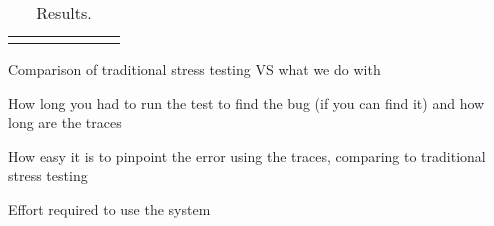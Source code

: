 \setlength{\tabcolsep}{.42em}
\begin{table*}[t]
\small
\centering
\begin{tabular}{l rr rrrr}
\centering

\end{tabular}
\caption{Results.}
\label{tab:testing}
\end{table*}

Comparison of traditional stress testing VS what we do with \psharp

How long you had to run the test to find the bug (if you can find it) and how long are the traces

How easy it is to pinpoint the error using the \psharp traces, comparing to traditional stress testing

Effort required to use the system
